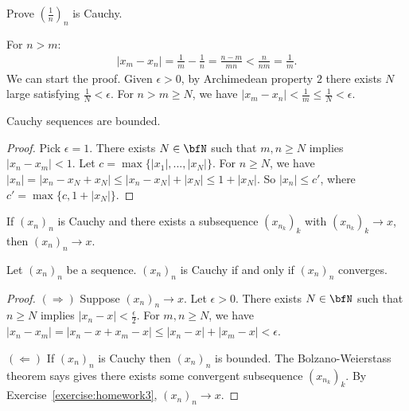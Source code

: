     \begin{example}
        Prove $\left(\frac{1}{n}\right)_n$ is Cauchy.
    \end{example}
        \begin{solution}
            For $n > m$:
                \begin{equation*}
                \begin{split}
                    |x_m - x_n| 
                    = \frac{1}{m} -\frac{1}{n} 
                    = \frac{n-m}{mn} 
                    < \frac{n}{nm} 
                    = \frac{1}{m}.
                \end{split}
                \end{equation*}
            We can start the proof. Given $\epsilon > 0$, by Archimedean property $2$ there exists $N$ large satisfying $\frac{1}{N} < \epsilon$. For $n > m \geq N$, we have $|x_m - x_n| < \frac{1}{m} \leq \frac{1}{N} < \epsilon$.
        \end{solution}

    \begin{proposition}
        Cauchy sequences are bounded.
    \end{proposition}
        \begin{proof}
            Pick $\epsilon = 1$. There exists $N \in  \bfN$ such that $m,n \geq N$ implies $|x_n - x_m| < 1$. Let $c = \max \{|x_1|,...,|x_N|\}$. For $n \geq N$, we have $|x_n| = |x_n - x_N + x_N| \leq |x_n - x_N| + |x_N| \leq 1+|x_N|$. So $|x_n| \leq c'$, where $c' = \max\{c, 1 + |x_N|\}$.
        \end{proof}

    \begin{exercise}\label{exercise:homework3}
        If $(x_n)_n$ is Cauchy and there exists a subsequence $(x_{n_k})_k$ with $(x_{n_k})_k \rightarrow x$, then $(x_n)_n \rightarrow x$.
    \end{exercise}

    \begin{theorem}
        Let $(x_n)_n$ be a sequence. $(x_n)_n$ is Cauchy if and only if $(x_n)_n$ converges.
    \end{theorem}
        \begin{proof}
            $(\Rightarrow)$ Suppose $(x_n)_n \rightarrow x$. Let $\epsilon > 0$. There exists $N \in \bfN$ such that $n \geq N$ implies $|x_n - x| < \frac{\epsilon}{2}$. For $m,n \geq N$, we have $|x_n - x_m| = |x_n - x + x_m - x| \leq |x_n - x| + |x_m - x| < \epsilon$.

            $(\Leftarrow)$ If $(x_n)_n$ is Cauchy then $(x_n)_n$ is bounded. The Bolzano-Weierstass theorem says gives there exists some convergent subsequence $(x_{n_k})_k$. By Exercise~\ref{exercise:homework3}, $(x_n)_n \rightarrow x$.
        \end{proof}

